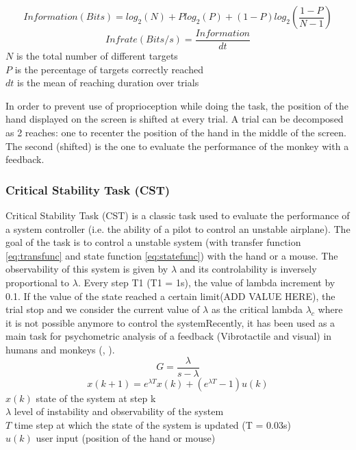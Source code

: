\documentclass[preprint,12pt]{elsarticle}
\begin{document}
\begin{equation} 
Information (Bits) = log_2(N) + Plog_2(P) + (1 - P)log_2(\frac{1-P}{N-1})
\label{eq:inf}
\end{equation}
\begin{equation} 
Infrate (Bits/s) = \frac{Information}{dt}
\label{eq:infrate}
\end{equation}
$N$ is the total number of different targets \\
$P$ is the percentage of targets correctly reached\\
$dt$ is the mean of reaching duration over trials

In order to prevent use of proprioception while doing the task, the position of the hand displayed on the screen is shifted at every trial. A trial can be decomposed as 2 reaches: one to recenter the position of the hand in the middle of the screen. The second (shifted) is the one to evaluate the performance of the monkey with a feedback.

\subsubsection{Critical Stability Task (CST)}
Critical Stability Task (CST) is a classic task used to evaluate the performance of a system controller (i.e. the ability of a pilot to control an unstable airplane). The goal of the task is to control a unstable system (with transfer function \ref{eq:transfunc} and state function \ref{eq:statefunc}) with the hand or a mouse. The observability of this system is given by $\lambda$ and its controlability is inversely proportional to $\lambda$. Every step T1 (T1 = 1s), the value of lambda increment by 0.1. If the value of the state reached a certain limit(ADD VALUE HERE), the trial stop and we consider the current value of $\lambda$ as the critical lambda $\lambda_c$ where it is not possible anymore to control the systemRecently, it has been used as a main task for psychometric analysis of a feedback (Vibrotactile and visual) in humans and monkeys (\citet{Quick2014}, \citet{Quick2015}).
\begin{equation} 
G = \frac{\lambda}{s-\lambda}
\label{eq:transfunc}
\end{equation}
\begin{equation} 
x(k+1) = e^{\lambda T}x(k) + (e^{\lambda T} - 1)u(k)
\label{eq:statefunc}
\end{equation}
$x(k)$ state of the system at step k\\
$\lambda$ level of instability and observability of the system\\
$T$ time step at which the state of the system is updated (T = 0.03s) \\
$u(k)$ user input (position of the hand or mouse)\\
\end{document}
